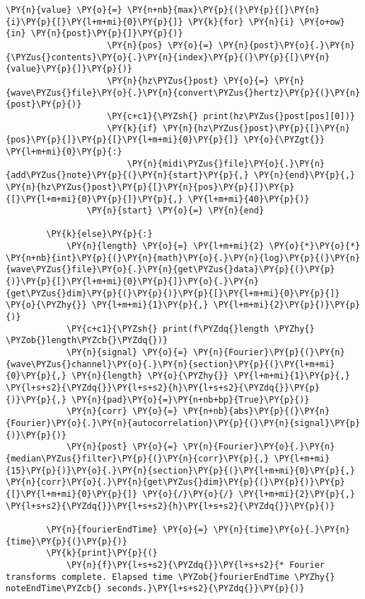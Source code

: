 \begin{Verbatim}[commandchars=\\\{\}]
                    \PY{n}{value} \PY{o}{=} \PY{n+nb}{max}\PY{p}{(}\PY{p}{[}\PY{n}{i}\PY{p}{[}\PY{l+m+mi}{0}\PY{p}{]} \PY{k}{for} \PY{n}{i} \PY{o+ow}{in} \PY{n}{post}\PY{p}{]}\PY{p}{)}
                    \PY{n}{pos} \PY{o}{=} \PY{n}{post}\PY{o}{.}\PY{n}{\PYZus{}contents}\PY{o}{.}\PY{n}{index}\PY{p}{(}\PY{p}{[}\PY{n}{value}\PY{p}{]}\PY{p}{)}
                    \PY{n}{hz\PYZus{}post} \PY{o}{=} \PY{n}{wave\PYZus{}file}\PY{o}{.}\PY{n}{convert\PYZus{}hertz}\PY{p}{(}\PY{n}{post}\PY{p}{)}
                    \PY{c+c1}{\PYZsh{} print(hz\PYZus{}post[pos][0])}
                    \PY{k}{if} \PY{n}{hz\PYZus{}post}\PY{p}{[}\PY{n}{pos}\PY{p}{]}\PY{p}{[}\PY{l+m+mi}{0}\PY{p}{]} \PY{o}{\PYZgt{}} \PY{l+m+mi}{0}\PY{p}{:}
                        \PY{n}{midi\PYZus{}file}\PY{o}{.}\PY{n}{add\PYZus{}note}\PY{p}{(}\PY{n}{start}\PY{p}{,} \PY{n}{end}\PY{p}{,} \PY{n}{hz\PYZus{}post}\PY{p}{[}\PY{n}{pos}\PY{p}{]}\PY{p}{[}\PY{l+m+mi}{0}\PY{p}{]}\PY{p}{,} \PY{l+m+mi}{40}\PY{p}{)}
                \PY{n}{start} \PY{o}{=} \PY{n}{end}

        \PY{k}{else}\PY{p}{:}
            \PY{n}{length} \PY{o}{=} \PY{l+m+mi}{2} \PY{o}{*}\PY{o}{*} \PY{n+nb}{int}\PY{p}{(}\PY{n}{math}\PY{o}{.}\PY{n}{log}\PY{p}{(}\PY{n}{wave\PYZus{}file}\PY{o}{.}\PY{n}{get\PYZus{}data}\PY{p}{(}\PY{p}{)}\PY{p}{[}\PY{l+m+mi}{0}\PY{p}{]}\PY{o}{.}\PY{n}{get\PYZus{}dim}\PY{p}{(}\PY{p}{)}\PY{p}{[}\PY{l+m+mi}{0}\PY{p}{]} \PY{o}{\PYZhy{}} \PY{l+m+mi}{1}\PY{p}{,} \PY{l+m+mi}{2}\PY{p}{)}\PY{p}{)}
            \PY{c+c1}{\PYZsh{} print(f\PYZdq{}length \PYZhy{} \PYZob{}length\PYZcb{}\PYZdq{})}
            \PY{n}{signal} \PY{o}{=} \PY{n}{Fourier}\PY{p}{(}\PY{n}{wave\PYZus{}channel}\PY{o}{.}\PY{n}{section}\PY{p}{(}\PY{l+m+mi}{0}\PY{p}{,} \PY{n}{length} \PY{o}{\PYZhy{}} \PY{l+m+mi}{1}\PY{p}{,} \PY{l+s+s2}{\PYZdq{}}\PY{l+s+s2}{h}\PY{l+s+s2}{\PYZdq{}}\PY{p}{)}\PY{p}{,} \PY{n}{pad}\PY{o}{=}\PY{n+nb+bp}{True}\PY{p}{)}
            \PY{n}{corr} \PY{o}{=} \PY{n+nb}{abs}\PY{p}{(}\PY{n}{Fourier}\PY{o}{.}\PY{n}{autocorrelation}\PY{p}{(}\PY{n}{signal}\PY{p}{)}\PY{p}{)}
            \PY{n}{post} \PY{o}{=} \PY{n}{Fourier}\PY{o}{.}\PY{n}{median\PYZus{}filter}\PY{p}{(}\PY{n}{corr}\PY{p}{,} \PY{l+m+mi}{15}\PY{p}{)}\PY{o}{.}\PY{n}{section}\PY{p}{(}\PY{l+m+mi}{0}\PY{p}{,} \PY{n}{corr}\PY{o}{.}\PY{n}{get\PYZus{}dim}\PY{p}{(}\PY{p}{)}\PY{p}{[}\PY{l+m+mi}{0}\PY{p}{]} \PY{o}{/}\PY{o}{/} \PY{l+m+mi}{2}\PY{p}{,} \PY{l+s+s2}{\PYZdq{}}\PY{l+s+s2}{h}\PY{l+s+s2}{\PYZdq{}}\PY{p}{)}

        \PY{n}{fourierEndTime} \PY{o}{=} \PY{n}{time}\PY{o}{.}\PY{n}{time}\PY{p}{(}\PY{p}{)}
        \PY{k}{print}\PY{p}{(}
            \PY{n}{f}\PY{l+s+s2}{\PYZdq{}}\PY{l+s+s2}{* Fourier transforms complete. Elapsed time \PYZob{}fourierEndTime \PYZhy{} noteEndTime\PYZcb{} seconds.}\PY{l+s+s2}{\PYZdq{}}\PY{p}{)}
        

\end{Verbatim}
